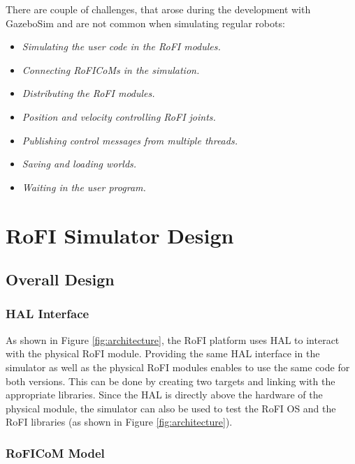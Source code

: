\documentclass[
  printed, %
  color,   %
  notable, %
  oneside, %
  nolof,   %
  nolot,   %
  nocover,
]{fithesis3}
\begin{document}
There are couple of challenges, that arose during the development with GazeboSim and are not common when simulating regular robots:
\begin{itemize}
    \item \emph{Simulating the user code in the RoFI modules.}
    \item \emph{Connecting RoFICoMs in the simulation.}
    \item \emph{Distributing the RoFI modules.}
    \item \emph{Position and velocity controlling RoFI joints.}
    \item \emph{Publishing control messages from multiple threads.}
    \item \emph{Saving and loading worlds.}
    \item \emph{Waiting in the user program.}
\end{itemize}


\chapter{RoFI Simulator Design}

\section{Overall Design}



\subsection{HAL Interface}

As shown in Figure \ref{fig:architecture}, the RoFI platform uses HAL to interact with the physical RoFI module.
Providing the same HAL interface in the simulator as well as the physical RoFI modules enables to use the same code for both versions.
This can be done by creating two targets and linking with the appropriate libraries.
Since the HAL is directly above the hardware of the physical module, the simulator can also be used to test the RoFI OS and the RoFI libraries (as shown in Figure \ref{fig:architecture}).

\subsection{RoFICoM Model}
\end{document}
